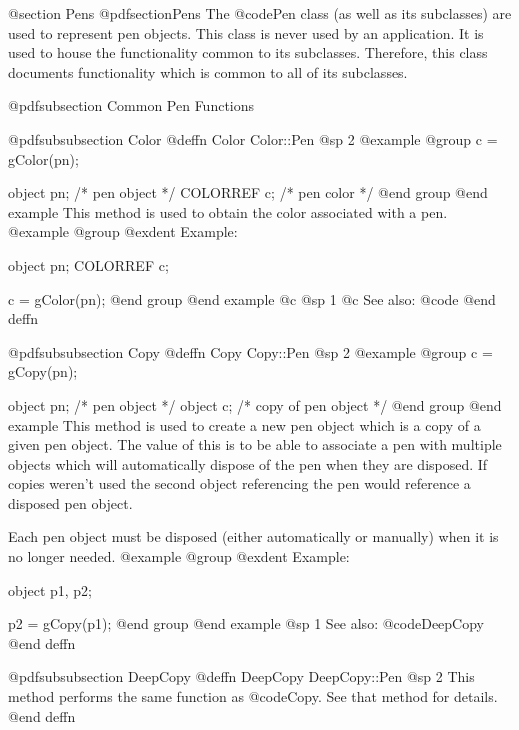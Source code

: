 @section Pens
@pdfsection{Pens}
The @code{Pen} class (as well as its subclasses) are used to represent
pen objects.  This class is never used by an application.  It is used
to house the functionality common to its subclasses.  Therefore, this
class documents functionality which is common to all of its subclasses.





@pdfsubsection {Common Pen Functions}




@pdfsubsubsection {Color}
@deffn {Color} Color::Pen
@sp 2
@example
@group
c = gColor(pn);

object    pn;   /*  pen object   */
COLORREF  c;    /*  pen color    */
@end group
@end example
This method is used to obtain the color associated with a pen.
@example
@group
@exdent Example:

object    pn;
COLORREF  c;

c = gColor(pn);
@end group
@end example
@c @sp 1
@c See also:  @code{}
@end deffn










@pdfsubsubsection {Copy}
@deffn {Copy} Copy::Pen
@sp 2
@example
@group
c = gCopy(pn);

object  pn;     /*  pen object          */
object  c;      /*  copy of pen object  */
@end group
@end example
This method is used to create a new pen object which is a copy of a
given pen object.  The value of this is to be able to associate a
pen with multiple objects which will automatically dispose of the
pen when they are disposed.  If copies weren't used the second object
referencing the pen would reference a disposed pen object.

Each pen object must be disposed (either automatically or manually)
when it is no longer needed.
@example
@group
@exdent Example:

object  p1, p2;

p2 = gCopy(p1);
@end group
@end example
@sp 1
See also:  @code{DeepCopy}
@end deffn









@pdfsubsubsection {DeepCopy}
@deffn {DeepCopy} DeepCopy::Pen
@sp 2
This method performs the same function as @code{Copy}.  See that
method for details.
@end deffn





